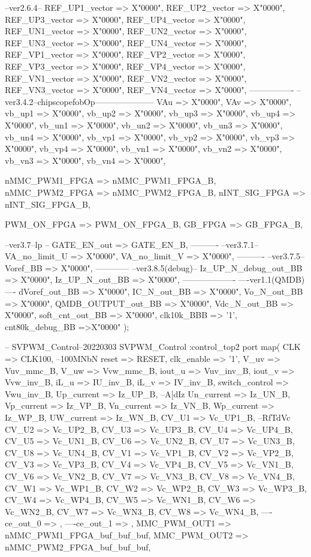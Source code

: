 \begin{mylisting}[language=VHDL,caption=トップモジュール,label=appF_Top_module_VHDL]
{{{			--ver2.6.4--
			REF_UP1_vector => X"0000",
			REF_UP2_vector => X"0000",
			REF_UP3_vector => X"0000",
			REF_UP4_vector	=> X"0000",
			REF_UN1_vector => X"0000",
			REF_UN2_vector	=> X"0000",
			REF_UN3_vector	=> X"0000",
			REF_UN4_vector	=> X"0000",
			REF_VP1_vector => X"0000",
			REF_VP2_vector	=> X"0000",
			REF_VP3_vector	=> X"0000",
			REF_VP4_vector	=> X"0000",
			REF_VN1_vector	=> X"0000",
			REF_VN2_vector	=> X"0000",
			REF_VN3_vector	=> X"0000",
			REF_VN4_vector	=> X"0000",
			----------------
			--ver3.4.2--chipscopefobOp---------------------
			VAu 	  =>	X"0000",
			VAv 	  =>	X"0000",
			vb_up1  =>	X"0000",
			vb_up2  =>	X"0000",
			vb_up3  =>	X"0000",
			vb_up4  =>	X"0000",
			vb_un1  =>	X"0000",
			vb_un2  =>	X"0000",
			vb_un3  =>	X"0000",
			vb_un4  =>	X"0000",
			vb_vp1  =>	X"0000",
			vb_vp2  =>	X"0000",
			vb_vp3  =>	X"0000",
			vb_vp4  =>	X"0000",
			vb_vn1  =>	X"0000",
			vb_vn2  =>	X"0000",
			vb_vn3  =>	X"0000",
			vb_vn4  =>	X"0000",

			nMMC_PWM1_FPGA	=> nMMC_PWM1_FPGA_B,
			nMMC_PWM2_FPGA	=> nMMC_PWM2_FPGA_B,
			nINT_SIG_FPGA	=> nINT_SIG_FPGA_B,
			
			PWM_ON_FPGA		=> PWM_ON_FPGA_B,
			GB_FPGA			=> GB_FPGA_B,

			--ver3.7--lp
--			GATE_EN_out => GATE_EN_B,
			----------
			--ver3.7.1--
			VA_no_limit_U  =>	X"0000",
			VA_no_limit_V  =>	X"0000",
			----------
			--ver3.7.5--
			Voref_BB  =>	X"0000",
			------------
			--ver3.8.5(debug)--
			Iz_UP_N_debug_out_BB => X"0000",
			Iz_UP_N_out_BB => X"0000",
			-------------------
			----ver1.1(QMDB)----			
			dVoref_out_BB      => X"0000",
			IC_N_out_BB        => X"0000",
			Vo_N_out_BB        => X"0000",
			QMDB_OUTPUT_out_BB => X"0000",
			Vdc_N_out_BB       => X"0000",
			soft_cnt_out_BB	 => X"0000",
			clk10k_BBB => '1',
			cnt80k_debug_BB =>X"0000"
			);

--	SVPWM_Control--20220303
		SVPWM_Control :control_top2
		port map(
			CLK		=> CLK100,									--100MNbN
			reset 		=> RESET,
			clk_enable => '1',
			V_uv		=>	Vuv_mmc_B,
         V_uw		=>	Vvw_mmc_B,
         iout_u	=>	Vuv_inv_B,
         iout_v 	=>	Vvw_inv_B,
         iL_u 	   =>	IU_inv_B,
         iL_v     =>	IV_inv_B,
			switch_control		=>	Vwu_inv_B,
			Up_current			=>	Iz_UP_B,			--A[dIz
         Un_current			=>	Iz_UN_B,
         Vp_current 			=>	Iz_VP_B,
         Vn_current			=>	Iz_VN_B,
         Wp_current			=>	Iz_WP_B,
         UW_current			=>	Iz_WN_B,
			CV_U1		=>	Vc_UP1_B,		--RfTdVc
			CV_U2		=>	Vc_UP2_B,
			CV_U3		=>	Vc_UP3_B,
			CV_U4		=>	Vc_UP4_B,
			CV_U5		=>	Vc_UN1_B,
			CV_U6		=>	Vc_UN2_B,
			CV_U7		=>	Vc_UN3_B,
			CV_U8		=>	Vc_UN4_B,
			CV_V1		=>	Vc_VP1_B,
			CV_V2		=>	Vc_VP2_B,
			CV_V3		=>	Vc_VP3_B,
			CV_V4		=>	Vc_VP4_B,
			CV_V5		=>	Vc_VN1_B,
			CV_V6		=>	Vc_VN2_B,
			CV_V7		=>	Vc_VN3_B,
			CV_V8		=>	Vc_VN4_B,
			CV_W1		=>	Vc_WP1_B,
			CV_W2		=>	Vc_WP2_B,
			CV_W3		=>	Vc_WP3_B,
			CV_W4		=>	Vc_WP4_B,
			CV_W5		=>	Vc_WN1_B,
			CV_W6		=>	Vc_WN2_B,
			CV_W7		=>	Vc_WN3_B,
			CV_W8		=>	Vc_WN4_B,
			----ce_out_0			=>	,	
			----ce_out_1			=>	,
			MMC_PWM_OUT1	=> nMMC_PWM1_FPGA_buf_buf_buf,
			MMC_PWM_OUT2	=> nMMC_PWM2_FPGA_buf_buf_buf,
			
}}}
\end{mylisting}
